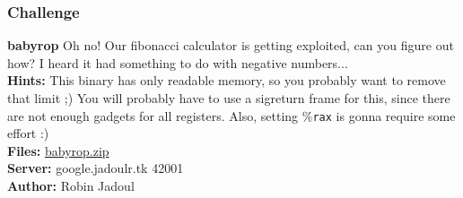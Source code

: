 \documentclass[aspectratio=169]{beamer}
\newcommand{\reg}[1]{\%\texttt{#1}}
\begin{document}
\begin{frame}[fragile]
    \frametitle{Challenge}
    {
        \begin{alertblock}{\textbf{babyrop}}
            Oh no! Our fibonacci calculator is getting exploited, can you figure out how?
            I heard it had something to do with negative numbers...\\
            \textbf{Hints:} This binary has only readable memory, so you probably want to remove that limit ;)
            You will probably have to use a sigreturn frame for this, since there are not enough gadgets for all registers.
            Also, setting \reg{rax} is gonna require some effort :)\\
            \textbf{Files:} \href{https://flagbot.ch/babyrop.zip}{babyrop.zip}\\
            \textbf{Server:} google.jadoulr.tk 42001\\
            \textbf{Author:} Robin Jadoul
        \end{alertblock}
    }
\end{frame}
\end{document}
